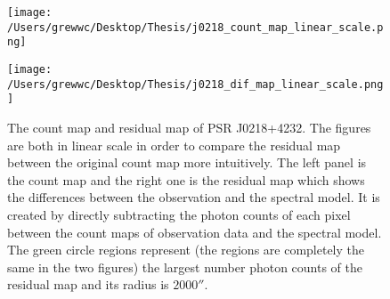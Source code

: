 \documentclass[12pt]{report}
\newcommand{\mycaption}[1]{\protect \caption{#1}}
\newcommand{\change}[1]{
  $<$\colorbox{red}{\textbf{change}}$>$#1$<$\colorbox{red}{\textbf{/change}}$>$
}
\begin{document}

            \begin{figure}[!ht]
              \begin{center}
              \begin{minipage}{0.45\textwidth}
                \begin{center} 
                  \texttt{[image: /Users/grewwc/Desktop/Thesis/j0218\_count\_map\_linear\_scale.png]}
                \end{center}
              \end{minipage}
              \begin{minipage}{0.45\textwidth}
                \begin{center}
                  \texttt{[image: /Users/grewwc/Desktop/Thesis/j0218\_dif\_map\_linear\_scale.png]}
                \end{center}
              \end{minipage}
            \end{center}
            \mycaption{The count map and residual map of PSR J0218+4232.
              The figures are both in linear scale in order to compare the residual map between the 
              original count map more intuitively. The left panel is the count map and the right 
              one is the residual map which shows the differences between the observation and the spectral 
              model. It is created by directly subtracting the photon counts of each pixel between 
              the count maps of observation data and the spectral model. The green circle regions represent
              (the regions are completely the same in the two figures)
              the largest number photon counts of the residual map and its radius is $2000''$.}
            \label{fig: j0218_count_map_diff}
            \end{figure}
\end{document}

